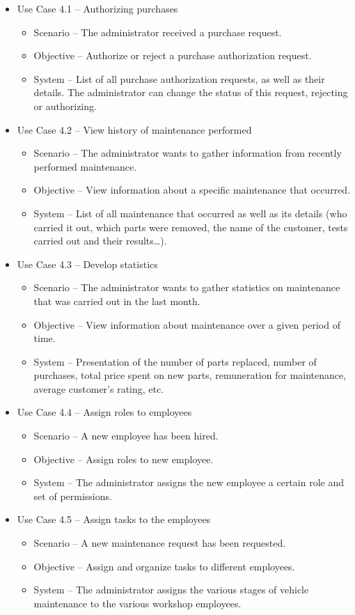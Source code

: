 \begin{itemize}
  \item Use Case 4.1 – Authorizing purchases
  \begin{itemize}
    \item Scenario –  The administrator received a purchase request.
    \item Objective – Authorize or reject a purchase authorization request.
    \item System – List of all purchase authorization requests, as well as their details. The administrator can change the status of this request, rejecting or authorizing. 
  \end{itemize}
  \item Use Case 4.2 – View history of maintenance performed
  \begin{itemize}
    \item Scenario – The administrator wants to gather information from recently performed maintenance.
    \item Objective – View information about a specific maintenance that occurred.
    \item System – List of all maintenance that occurred as well as its details (who carried it out, which parts were removed, the name of the customer, tests carried out and their results…). 
  \end{itemize}
  \item Use Case 4.3 – Develop statistics
  \begin{itemize}
    \item Scenario – The administrator wants to gather statistics on maintenance that was carried out in the last month.
    \item Objective – View information about maintenance over a given period of time.
    \item System – Presentation of the number of parts replaced, number of purchases, total price spent on new parts, remuneration for maintenance, average customer’s rating, etc.
  \end{itemize}
  \item Use Case 4.4 – Assign roles to employees
  \begin{itemize}
    \item Scenario – A new employee has been hired.
    \item Objective –  Assign roles to new employee.
    \item System – The administrator assigns the new employee a certain role and set of permissions.
  \end{itemize}
  \item Use Case 4.5 – Assign tasks to the employees
  \begin{itemize}
    \item Scenario – A new maintenance request has been requested.
    \item Objective – Assign and organize tasks to different employees.
    \item System – The administrator assigns the various stages of vehicle maintenance to the various workshop employees.
  \end{itemize}
\end{itemize}
\hfill \break


